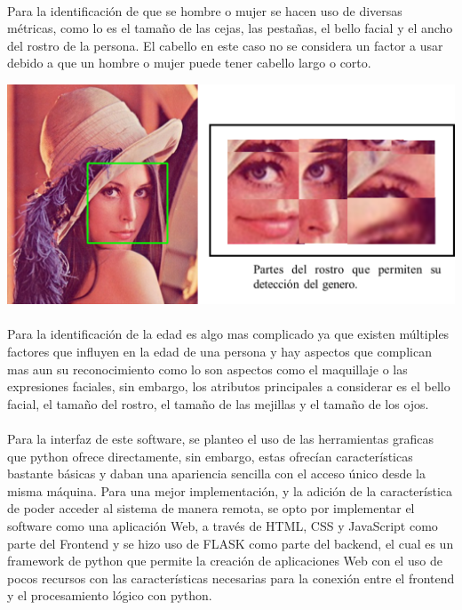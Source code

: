 \documentclass[9pt]{report}
\newenvironment{Figura}
  {\par\medskip\noindent\minipage{\linewidth}}
  {\endminipage\par\medskip}
\begin{document}
\begin{multicols}{2}
	\paragraph{}
	Para la identificación de que se hombre o mujer se hacen uso de diversas métricas, como lo es el tamaño de las cejas, las pestañas, el bello facial y el ancho del rostro de la persona. El cabello en este caso no se considera un factor a usar debido a que un hombre o mujer puede tener cabello largo o corto.
	\begin{Figura}
		\includegraphics[width=\textwidth]{3}
		\label{figura4}
	\end{Figura}
	\paragraph{}
	Para la identificación de la edad es algo mas complicado ya que existen múltiples factores que influyen en la edad de una persona y hay aspectos que complican mas aun su reconocimiento como lo son aspectos como el maquillaje o las expresiones faciales, sin embargo, los atributos principales a considerar es el bello facial, el tamaño del rostro, el tamaño de las mejillas y el tamaño de los ojos.
	\paragraph{}
	Para la interfaz de este software, se planteo el uso de las herramientas graficas que python ofrece directamente, sin embargo, estas ofrecían características bastante básicas y daban una apariencia sencilla con el acceso único desde la misma máquina. Para una mejor implementación, y la adición de la característica de poder acceder al sistema de manera remota, se opto por implementar el software como una aplicación Web, a través de HTML, CSS y JavaScript como parte del Frontend y se hizo uso de FLASK como parte del backend, el cual es un framework de python que permite la creación de aplicaciones Web con el uso de pocos recursos con las características necesarias para la conexión entre el frontend y el procesamiento lógico con python.

\end{multicols}
\end{document}
